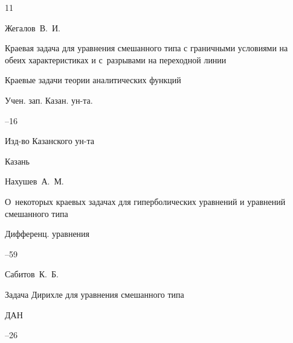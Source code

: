 \begin{thebibliography}{11}

\by Жегалов~В.~И.

\paper Краевая задача для уравнения смешанного типа с граничными условиями на обеих характеристиках и с~разрывами на переходной линии

\inbook Краевые задачи теории аналитических функций

\serial Учен. зап. Казан. ун-та.




--16

\publ Изд-во Казанского ун-та

\publaddr Казань









\by Нахушев~А.~М.

\paper О~некоторых краевых задачах для гиперболических уравнений и уравнений смешанного типа

\jour Дифференц. уравнения




--59








\by Сабитов~К.~Б.

\paper Задача Дирихле для уравнения смешанного типа

\jour ДАН




--26









\end{thebibliography}
